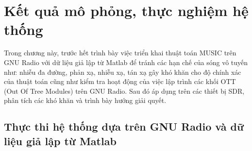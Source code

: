 \setcounter{chapter}{2}
\chapter[\MakeUppercase{Kết quả mô phỏng, thực nghiệm hệ thống}]{Kết quả mô phỏng, thực nghiệm hệ thống}
Trong chương này, trước hết trình bày việc triển khai thuật toán MUSIC trên GNU Radio với dữ liệu giả lập từ Matlab để tránh các hạn chế của sóng vô tuyến như: nhiễu đa đường, phản xạ, nhiễu xạ, tán xạ gây khó khăn cho độ chính xác của thuật toán cũng như kiểm tra hoạt động của việc lập trình các khối OTT (Out Of Tree Modules) trên GNU Radio. Sau đó áp dụng trên các thiết bị SDR, phân tích các khó khăn và trình bày hướng giải quyết.

\section{Thực thi hệ thống dựa trên GNU Radio và dữ liệu giả lập từ Matlab}
